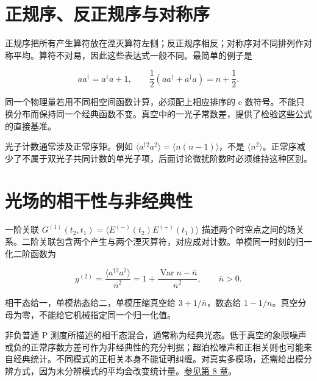 \documentclass[UTF8,a4paper,zihao=-4,openany,fontset=fandol]{ctexbook}
\begin{document}
\section{正规序、反正规序与对称序}\label{sec:02:9}


正规序把所有产生算符放在湮灭算符左侧；反正规序相反；对称序对不同排列作对称平均。算符不对易，因此这些表达式一般不同。最简单的例子是



\begin{equation*}
aa^\dagger=a^\dagger a+1,\qquad
\frac12(aa^\dagger+a^\dagger a)=n+\frac12.
\tag{2.11}\label{eq:2.11}
\end{equation*}


同一个物理量若用不同相空间函数计算，必须配上相应排序的 c 数符号。不能只换分布而保持同一个经典函数不变。真空中的一光子常数差，提供了检验这些公式的直接基准。



光子计数通常涉及正常序矩。例如 $\langle a^{\dagger2}a^2\rangle=\langle n(n-1)\rangle$，不是 $\langle n^2\rangle$。正常序减少了不属于双光子共同计数的单光子项，后面讨论微扰阶数时必须维持这种区别。



\section{光场的相干性与非经典性}\label{sec:02:10}


一阶关联 $G^{(1)}(t_2,t_1)=\langle E^{(-)}(t_2)E^{(+)}(t_1)\rangle$ 描述两个时空点之间的场关系。二阶关联包含两个产生与两个湮灭算符，对应成对计数。单模同一时刻的归一化二阶函数为



\begin{equation*}
g^{(2)}=\frac{\langle a^{\dagger2}a^2\rangle}{\bar n^2}
=1+\frac{\operatorname{Var}n-\bar n}{\bar n^2},\qquad \bar n>0.
\tag{2.12}\label{eq:2.12}
\end{equation*}


相干态给一，单模热态给二，单模压缩真空给 $3+1/\bar n$，数态给 $1-1/n$。真空分母为零，不能给它机械指定同一个归一化值。



非负普通 P 测度所描述的相干态混合，通常称为经典光态。低于真空的象限噪声或负的正常序数方差可作为非经典性的充分判据；超泊松噪声和正相关则也可能来自经典统计。不同模式的正相关本身不能证明纠缠。对真实多模场，还需给出模分辨方式，因为未分辨模式的平均会改变统计量。\hyperref[ch:08]{参见第 8 章}。
\end{document}
